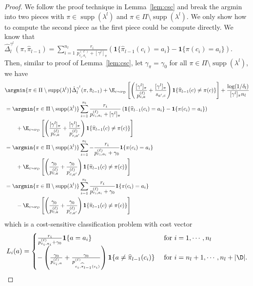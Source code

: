 \documentclass{article}
\newcommand{\pill}{\widehat{\pi}_{l-1}}
\newcommand{\1}{\mathbf{1}}
\newcommand{\supp}{\operatorname{supp}}
\begin{document}
\begin{proof}
We follow the proof technique in Lemma~\ref{lem:csc} and break the argmin into two pieces with $\pi\in\supp(\lambda^{l})$ and $\pi\in\Pi\setminus\supp(\lambda^{l})$. We only show how to compute the second piece as the first piece could be compute directly. We know that $\hat{\Delta}_l^{\gamma^l}(\pi,\hat{\pi}_{l-1})=\sum_{i=1}^{n_l}\frac{r_i}{p^{(\ell)}_{c_i,a_i}+[\gamma^l]_\pi}(\1\{\pill(c_i)=a_i\}-\1\{\pi(c_i)=a_i\})$. Then, similar to proof of Lemma~\ref{lem:csc}, let $\gamma_\pi=\gamma_0$ for all $\pi\in\Pi\setminus\supp(\lambda^{l})$, we have
\begin{align*}
    &\argmin{\pi\in\Pi\setminus\supp(\lambda^{l})}\hat{\Delta}_l^{\gamma^l}(\pi,\hat{\pi}_{l-1})+\E_{c\sim\nu_{\mathcal{D}}} \left[ \left(\frac{[\gamma^l]_\pi}{p_{c,a}^{(\ell)}}+\frac{[\gamma^l]_\pi}{s_{a',c}}\right) \1\{\pill(c )\ne \pi(c )\} \right]+\frac{\log(1/\delta_l)}{[\gamma^l]_\pi n_l}\\
    &= \argmin{\pi\in\Pi\setminus\supp(\lambda^{l})}\sum_{i=1}^{n_l}\frac{r_i}{p^{(\ell)}_{c_i,a_i}+[\gamma^l]_\pi}\left(\1\{\pill(c_i)=a_i\}-\1\{\pi(c_i)=a_i\}\right)\\
    &\qquad+\E_{c\sim\nu_{\mathcal{D}}} \left[\left(\frac{[\gamma^l]_\pi}{p_{c,a}^{(\ell)}}+\frac{[\gamma^l]_\pi}{p_{c,a'}^{(\ell)}}\right) \1\{\pill(c )\ne \pi(c )\} \right]\\
    &= \argmin{\pi\in\Pi\setminus\supp(\lambda^{l})}\sum_{i=1}^{n_l}-\frac{r_i}{p^{(\ell)}_{c_i,a_i}+\gamma_0}\1\{\pi(c_i)=a_i\}\\
    &\qquad+\E_{c\sim\nu_{\mathcal{D}}} \left[\left(\frac{\gamma_0}{p_{c,a}^{(\ell)}}+\frac{\gamma_0}{p_{c,a'}^{(\ell)}}\right) \1\{\pill(c )\ne \pi(c )\} \right]\\
    &= \argmin{\pi\in\Pi\setminus\supp(\lambda^{l})}\sum_{i=1}^{n_l}\frac{r_i}{p^{(\ell)}_{c_i,a_i}+\gamma_0}\1\{\pi(c_i)=a_i\}\\
    &\qquad-\E_{c\sim\nu_{\mathcal{D}}} \left[\left(\frac{\gamma_0}{p_{c,a}^{(\ell)}}+\frac{\gamma_0}{p_{c,a'}^{(\ell)}}\right) \1\{\pill(c )\ne \pi(c )\} \right]
\end{align*}
which is a cost-sensitive classification problem with cost vector
\[
L_i(a)=
\begin{cases}
    \frac{r_i}{p^{(\ell)}_{c_i,a_i}+\gamma_0}\1\{a=a_i\} &\textrm{ for }i=1,\cdots,n_l\\
    -\left(\frac{\gamma_0}{p_{c_i,a}^{(\ell)}}+\frac{\gamma_0}{p_{c_i,\pill(c_i)}^{(\ell)}}\right)\1\{a\neq \pill(c_i)\}&\textrm{ for }i=n_l+1,\cdots,n_l+|\D|.
\end{cases}
\]
\end{proof}
\end{document}
